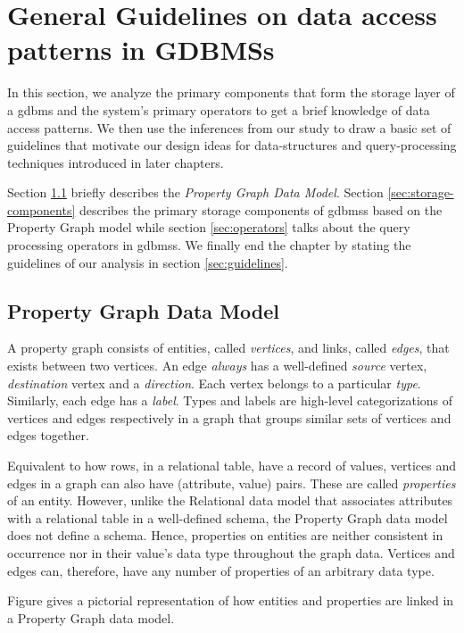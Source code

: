 \chapter{General Guidelines on data access patterns in GDBMSs}
\label{c:guidelines}

In this section, we analyze the primary components that form the storage layer of a \gls{gdbms} and the system's primary operators to get a brief knowledge of data access patterns. We then use the inferences from our study to draw a basic set of guidelines that motivate our design ideas for data-structures and query-processing techniques introduced in later chapters.

Section \ref{sec:property-graph-data-model} briefly describes the \emph{Property Graph Data Model}. Section \ref{sec:storage-components} describes the primary storage components of \gls{gdbms}s based on the Property Graph model while section \ref{sec:operators} talks about the query processing operators in \gls{gdbms}s. We finally end the chapter by stating the guidelines of our analysis in section \ref{sec:guidelines}.

\section{Property Graph Data Model}
\label{sec:property-graph-data-model}

A property graph consists of entities, called \emph{vertices}, and links, called \emph{edges}, that exists between two vertices. An edge \emph{always} has a well-defined \emph{source} vertex, \emph{destination} vertex and a \emph{direction}. Each vertex belongs to a particular \emph{type}. Similarly, each edge has a \emph{label}. Types and labels are high-level categorizations of vertices and edges respectively in a graph that groups similar sets of vertices and edges together.

Equivalent to how rows, in a relational table, have a record of values, vertices and edges in a graph can also have (attribute, value) pairs. These are called \emph{properties} of an entity. However, unlike the Relational data model that associates attributes with a relational table in a well-defined schema, the Property Graph data model does not define a schema. Hence, properties on entities are neither consistent in occurrence nor in their value's data type throughout the graph data. Vertices and edges can, therefore, have any number of properties of an arbitrary data type.

Figure \cite{property} gives a pictorial representation of how entities and properties are linked in a Property Graph data model.

